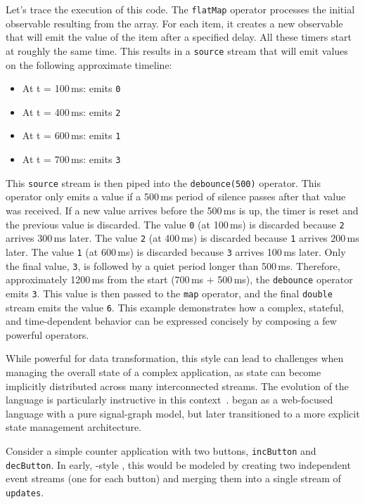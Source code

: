Let's trace the execution of this code. The \texttt{flatMap} operator processes the initial
observable resulting from the array. For each item, it creates a new observable that will emit the
value of the item after a specified delay. All these timers start at roughly the same time. This
results in a \texttt{source} stream that will emit values on the following approximate timeline:
\begin{itemize}
  \item At t = 100\,ms: emits \texttt{0}
  \item At t = 400\,ms: emits \texttt{2}
  \item At t = 600\,ms: emits \texttt{1}
  \item At t = 700\,ms: emits \texttt{3}
\end{itemize}
This \texttt{source} stream is then piped into the \texttt{debounce(500)} operator. This operator
only emits a value if a 500\,ms period of silence passes after that value was received. If a new
value arrives before the 500\,ms is up, the timer is reset and the previous value is discarded. The
value \texttt{0} (at 100\,ms) is discarded because \texttt{2} arrives 300\,ms later. The value
\texttt{2} (at 400\,ms) is discarded because \texttt{1} arrives 200\,ms later. The value \texttt{1}
(at 600\,ms) is discarded because \texttt{3} arrives 100\,ms later. Only the final value,
\texttt{3}, is followed by a quiet period longer than 500\,ms. Therefore, approximately 1200\,ms
from the start (700\,ms + 500\,ms), the \texttt{debounce} operator emits \texttt{3}. This value is
then passed to the \texttt{map} operator, and the final \texttt{double} stream emits the value
\texttt{6}. This example demonstrates how a complex, stateful, and time-dependent behavior can be
expressed concisely by composing a few powerful operators.

While powerful for data transformation, this style can lead to challenges when managing the overall
state of a complex application, as state can become implicitly distributed across many
interconnected streams. The evolution of the \Elm language is particularly instructive in
this context~\cite{DBLP:conf/pldi/CzaplickiC13}. \Elm began as a web-focused \frp language
with a pure signal-graph model, but later transitioned to a more explicit state management
architecture.

Consider a simple counter application with two buttons, \texttt{incButton} and \texttt{decButton}.
In early, \frp-style \Elm, this would be modeled by creating two independent event streams
(one for each button) and merging them into a single stream of \texttt{updates}.

